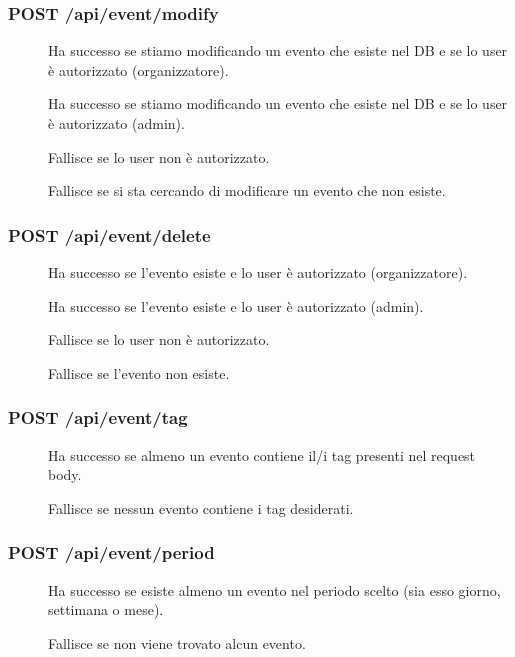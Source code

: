 \documentclass{article}
\begin{document}
\subsubsection{POST /api/event/modify}
\begin{description}
    \item[] Ha successo se stiamo modificando un evento che esiste nel DB e se lo user è autorizzato (organizzatore).
    \item[] Ha successo se stiamo modificando un evento che esiste nel DB e se lo user è autorizzato (admin).
    \item[] Fallisce se lo user non è autorizzato.
    \item[] Fallisce se si sta cercando di modificare un evento che non esiste.
\end{description}
\subsubsection{POST /api/event/delete}
\begin{description}
    \item[] Ha successo se l'evento esiste e lo user è autorizzato (organizzatore).
    \item[] Ha successo se l'evento esiste e lo user è autorizzato (admin).
    \item[] Fallisce se lo user non è autorizzato.
    \item[] Fallisce se l'evento non esiste.
\end{description}
\subsubsection{POST /api/event/tag}
\begin{description}
    \item[] Ha successo se almeno un evento contiene il/i tag presenti nel request body.
    \item[] Fallisce se nessun evento contiene i tag desiderati.
\end{description}
\subsubsection{POST /api/event/period}
\begin{description}
    \item[] Ha successo se esiste almeno un evento nel periodo scelto (sia esso giorno, settimana o mese).
    \item[] Fallisce se non viene trovato alcun evento.
\end{description}
\end{document}
